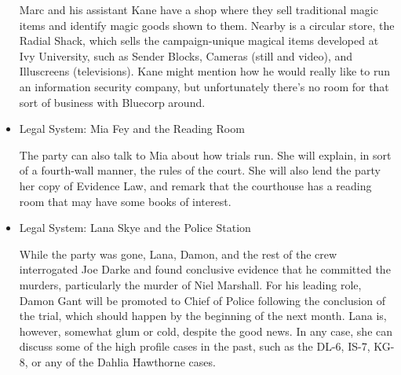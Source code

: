 \begin{itemize}
Marc and his assistant Kane have a shop where they sell traditional magic items and identify magic goods shown to them. Nearby is a circular store, the Radial Shack, which sells the campaign-unique magical items developed at Ivy University, such as Sender Blocks, Cameras (still and video), and Illuscreens (televisions). Kane might mention how he would really like to run an information security company, but unfortunately there's no room for that sort of business with Bluecorp around.

\item Legal System: Mia Fey and the Reading Room

The party can also talk to Mia about how trials run. She will explain, in sort of a fourth-wall manner, the rules of the court. She will also lend the party her copy of Evidence Law, and remark that the courthouse has a reading room that may have some books of interest.

\item Legal System: Lana Skye and the Police Station

While the party was gone, Lana, Damon, and the rest of the crew interrogated Joe Darke and found conclusive evidence that he committed the murders, particularly the murder of Niel Marshall. For his leading role, Damon Gant will be promoted to Chief of Police following the conclusion of the trial, which should happen by the beginning of the next month. Lana is, however, somewhat glum or cold, despite the good news. In any case, she can discuss some of the high profile cases in the past, such as the DL-6, IS-7, KG-8, or any of the Dahlia Hawthorne cases. 
\end{itemize}

